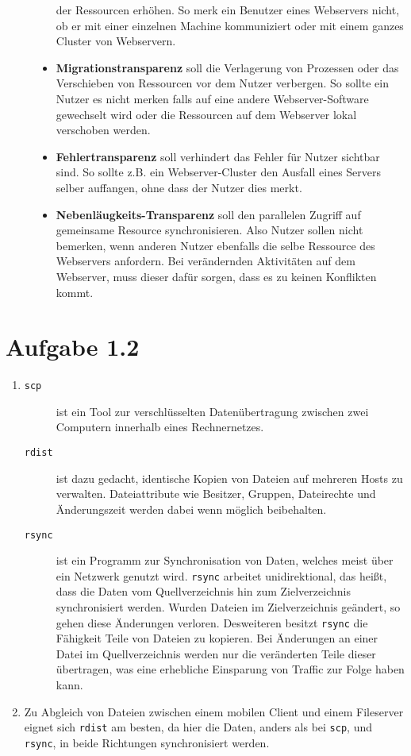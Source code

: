 \documentclass[german,12pt,a4paper]{article}
\begin{document}
\begin{description}
\begin{itemize}
		der Ressourcen erhöhen. So merk ein Benutzer eines Webservers nicht, ob er mit einer einzelnen
		Machine kommuniziert oder mit einem ganzes Cluster von Webservern.
		\item \textbf{Migrationstransparenz} soll die Verlagerung von Prozessen oder das Verschieben von
		Ressourcen vor dem Nutzer verbergen. So sollte ein Nutzer es nicht merken falls auf eine andere
		Webserver-Software gewechselt wird oder die Ressourcen auf dem Webserver lokal verschoben
		werden.
		\item \textbf{Fehlertransparenz} soll verhindert das Fehler für Nutzer sichtbar sind. So sollte
		z.B. ein Webserver-Cluster den Ausfall eines Servers selber auffangen, ohne dass der Nutzer dies
		merkt.
		\item \textbf{Nebenläugkeits-Transparenz} soll den parallelen Zugriff auf gemeinsame Resource
		synchronisieren. Also Nutzer sollen nicht bemerken, wenn anderen Nutzer ebenfalls die selbe
		Ressource des Webservers anfordern. Bei verändernden Aktivitäten auf dem Webserver, muss dieser
		dafür sorgen, dass es zu keinen Konflikten kommt. 
	\end{itemize}
\end{description}


\section*{Aufgabe 1.2}

\begin{enumerate}
	\item 
		\begin{description}
			\item[\texttt{scp}] ist ein Tool zur verschlüsselten Datenübertragung 
				zwischen zwei Computern innerhalb eines Rechnernetzes.
			\item[\texttt{rdist}] ist dazu gedacht, identische Kopien von Dateien 
				auf mehreren Hosts zu verwalten. Dateiattribute wie Besitzer, Gruppen, 
				Dateirechte und Änderungszeit werden dabei wenn möglich beibehalten.
			\item[\texttt{rsync}] ist ein Programm zur Synchronisation von Daten, 
				welches meist über ein Netzwerk genutzt wird. \texttt{rsync} arbeitet
				unidirektional, das heißt, dass die Daten vom 
				Quellverzeichnis hin zum Zielverzeichnis synchronisiert werden. Wurden 
				Dateien im Zielverzeichnis geändert, so gehen diese Änderungen verloren.
				Desweiteren besitzt \texttt{rsync} die Fähigkeit Teile von Dateien 
				zu kopieren. Bei Änderungen an einer Datei im Quellverzeichnis werden 
				nur die veränderten Teile dieser übertragen, was eine erhebliche Einsparung von 
				Traffic zur Folge haben kann.
		\end{description}
	\item Zu Abgleich von Dateien zwischen einem mobilen Client und einem Fileserver 
		eignet sich \texttt{rdist} am besten, da hier die Daten, anders als bei \texttt{scp},
		und \texttt{rsync}, in beide Richtungen synchronisiert werden.
\end{enumerate}
\end{document}
